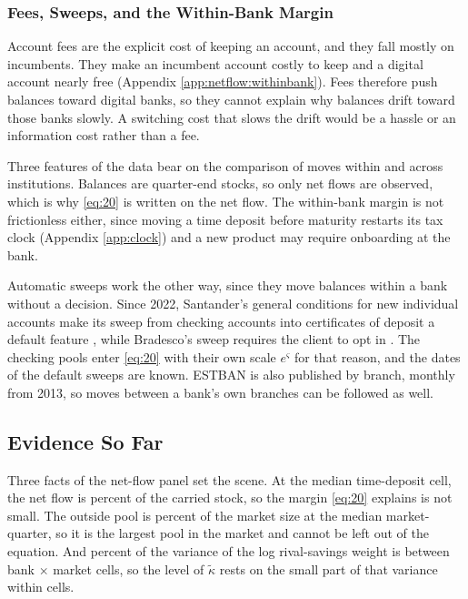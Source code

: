\subsubsection{Fees, Sweeps, and the Within-Bank Margin}\label{sec:disentangle:switching}

Account fees are the explicit cost of keeping an account, and they fall mostly on incumbents. They make an incumbent account costly to keep and a digital account nearly free (Appendix \ref{app:netflow:withinbank}). Fees therefore push balances toward digital banks, so they cannot explain why balances drift toward those banks slowly. A switching cost that slows the drift would be a hassle or an information cost rather than a fee.

Three features of the data bear on the comparison of moves within and across institutions. Balances are quarter-end stocks, so only net flows are observed, which is why \eqref{eq:20} is written on the net flow. The within-bank margin is not frictionless either, since moving a time deposit before maturity restarts its tax clock (Appendix \ref{app:clock}) and a new product may require onboarding at the bank.

Automatic sweeps work the other way, since they move balances within a bank without a decision. Since 2022, Santander's general conditions for new individual accounts make its sweep from checking accounts into certificates of deposit a default feature \parencite{santander_condicoes_pf_2022}, while Bradesco's sweep requires the client to opt in \parencite{bradesco_investfacil_2015,bradesco_investfacil_2020}. The checking pools enter \eqref{eq:20} with their own scale $e^{\varsigma}$ for that reason, and the dates of the default sweeps are known. ESTBAN is also published by branch, monthly from 2013, so moves between a bank's own branches can be followed as well.

\subsection{Evidence So Far}\label{sec:disentangle:evidence}

Three facts of the net-flow panel set the scene. At the median time-deposit cell, the net flow is  percent of the carried stock, so the margin \eqref{eq:20} explains is not small.
The outside pool is  percent of the market size at the median market-quarter, so it is the largest pool in the market and cannot be left out of the equation.
And  percent of the variance of the log rival-savings weight is between bank $\times$ market cells, so the level of $\tilde{\kappa}$ rests on the small part of that variance within cells.

